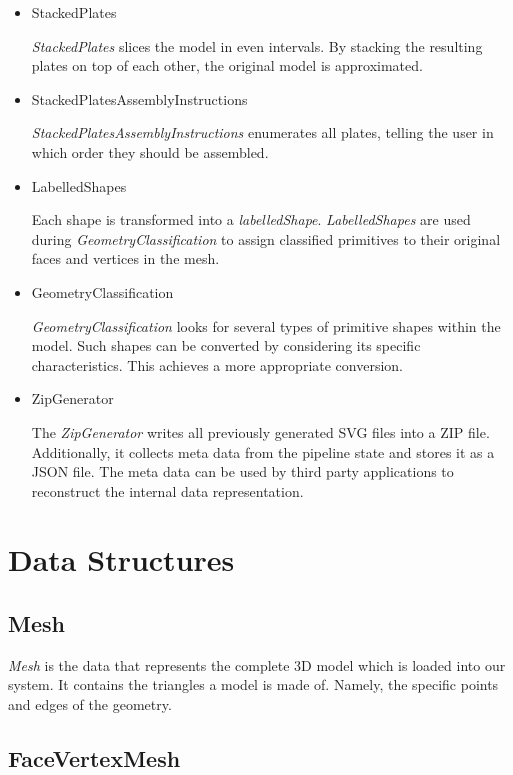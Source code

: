 \documentclass[../ClassicThesis.tex]{subfiles}
\begin{document}
\begin{itemize}
\item StackedPlates

\emph{StackedPlates} slices the model in even intervals. By stacking the resulting plates on top of each other, the original model is approximated.


\item StackedPlatesAssemblyInstructions

\emph{StackedPlatesAssemblyInstructions} enumerates all plates, telling the user in which order they should be assembled.


\item LabelledShapes

Each shape is transformed into a \emph{labelledShape}. \emph{LabelledShapes} are used during \emph{GeometryClassification} to assign classified primitives to their original faces and vertices in the mesh.


\item GeometryClassification

\emph{GeometryClassification} looks for several types of primitive shapes within the model. Such shapes can be converted by considering its specific characteristics. This achieves a more appropriate conversion.


\item ZipGenerator

The \emph{ZipGenerator} writes all previously generated SVG files into a ZIP file. Additionally, it collects meta data from the pipeline state and stores it as a JSON file. The meta data can be used by third party applications to reconstruct the internal data representation.

\end{itemize}



\section{Data Structures}\label{sec:datastructures}

\subsection*{Mesh}

\emph{Mesh} is the data that represents the complete 3D model which is loaded into our system. It contains the triangles a model is made of. Namely, the specific points and edges of the geometry.

\subsection*{FaceVertexMesh}
\end{document}

